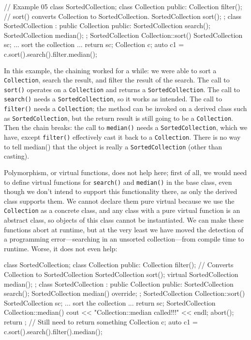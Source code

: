 \begin{code}
// Example 05
class SortedCollection;
class Collection {
  public:
  Collection filter();
  // sort() converts Collection to SortedCollection.
  SortedCollection sort();
};
class SortedCollection : public Collection {
  public:
  SortedCollection search();
  SortedCollection median();
};
SortedCollection Collection::sort() {
  SortedCollection sc;
  ... sort the collection ...
  return sc;
}
Collection c;
auto c1 = c.sort().search().filter.median();
\end{code}

In this example, the chaining worked for a while: we were able to sort a \texttt{Collection}, search the result, and filter the result of the search. The call to \texttt{sort()} operates on a \texttt{Collection} and returns a \texttt{SortedCollection}. The call to \texttt{search()} needs a \texttt{SortedCollection}, so it works as intended. The call to \texttt{filter()} needs a \texttt{Collection}; the method can be invoked on a derived class such as \texttt{SortedCollection}, but the return result is still going to be a \texttt{Collection}. Then the chain breaks: the call to \texttt{median()} needs a \texttt{SortedCollection}, which we have, except \texttt{filter()} effectively cast it back to a \texttt{Collection}. There is no way to tell median() that the object is really a \texttt{SortedCollection} (other than casting).

Polymorphism, or virtual functions, does not help here; first of all, we would need to define virtual functions for \texttt{search()} and \texttt{median()} in the base class, even though we don't intend to support this functionality there, as only the derived class supports them. We cannot declare them pure virtual because we use the \texttt{Collection} as a concrete class, and any class with a pure virtual function is an abstract class, so objects of this class cannot be instantiated. We can make these functions abort at runtime, but at the very least we have moved the detection of a programming error---searching in an unsorted collection---from compile time to runtime. Worse, it does not even help:

\begin{code}
class SortedCollection;
class Collection {
  public:
  Collection filter();
  // Converts Collection to SortedCollection
  SortedCollection sort();
  virtual SortedCollection median();
};
class SortedCollection : public Collection {
  public:
  SortedCollection search();
  SortedCollection median() override;
};
SortedCollection Collection::sort() {
  SortedCollection sc;
  ... sort the collection ...
  return sc;
}
SortedCollection Collection::median() {
  cout << "Collection::median called!!!" << endl;
  abort();
  return {};     // Still need to return something
}
Collection c;
auto c1 = c.sort().search().filter().median();
\end{code}

